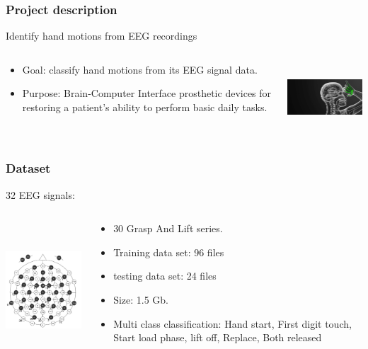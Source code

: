\documentclass{beamer}
\begin{document}
\begin{frame}
\frametitle{Project description}
Identify hand motions from EEG recordings
\begin{columns}[T]
\begin{column}{.5\textwidth}
\begin{itemize} 
\item Goal: classify hand motions from its EEG signal data.  
\item Purpose: Brain-Computer Interface prosthetic devices for restoring a patient's ability to perform basic daily tasks. 
\end{itemize}
\end{column}
\begin{column}{.5\textwidth}
\begin{center}
\includegraphics[height=1.0in]{front_page.png}
\end{center}
\end{column}
\end{columns}
  \end{frame}


\begin{frame}
\frametitle{Dataset}
32 EEG signals:
\begin{columns}[T]
\begin{column}{.5\textwidth}
\begin{center}
\includegraphics[height=2.0in]{EEG_Electrode_Numbering.jpg}
\end{center}
\end{column}
\begin{column}{.5\textwidth}
\begin{itemize} 
\item 30 Grasp And Lift series.
\item Training data set: 96 files
\item testing data set: 24 files
\item  Size: 1.5 Gb.
\item Multi class classification: Hand start, First digit touch, Start load phase, lift off, Replace, Both released
\end{itemize}
\end{column}
\end{columns}
\end{frame}
\end{document}
